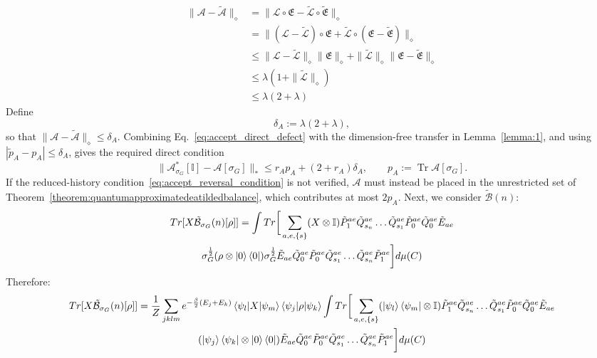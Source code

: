 \documentclass[aps,floatfix,10pt,amssymb,amsfont,amsmath,superscriptaddress,float,nofootinbib,longbibliography,nobalancelastpage,twocolumn]{revtex4-2}
\begin{document}
\begin{widetext}
\begin{align}
    \|\mathcal{A} - \tilde{\mathcal{A}}\|_{\diamond} &= \|\mathcal{L} \circ \mathfrak{E} - \tilde{\mathcal{L}} \circ \tilde{\mathfrak{E}}\|_{\diamond}\\
    &=\|(\mathcal{L}-\tilde{\mathcal{L}}) \circ \mathfrak{E} + \tilde{\mathcal{L}} \circ (\mathfrak{E}-\tilde{\mathfrak{E}})\|_{\diamond}\\
    &\leq\|\mathcal{L}-\tilde{\mathcal{L}}\|_{\diamond} \|\mathfrak{E} \|_{\diamond}+ \|\tilde{\mathcal{L}}\|_{\diamond} \|\mathfrak{E}-\tilde{\mathfrak{E}}\|_{\diamond}\\
    &\leq \lambda(1+\|\tilde{\mathcal{L}}\|_{\diamond})\\
    &\leq \lambda(2+\lambda)
\end{align}
Define
\begin{equation}
    \delta_A:=\lambda(2+\lambda),
\end{equation}
so that $\|\mathcal{A}-\tilde{\mathcal{A}}\|_\diamond\leq\delta_A$. Combining
Eq.~\eqref{eq:accept_direct_defect} with the dimension-free transfer in
Lemma~\ref{lemma:1}, and using
$|\tilde p_A-p_A|\leq\delta_A$, gives the required direct condition
\begin{equation}
    \|\mathcal{A}^*_{\sigma_G}[\mathbb{I}]-\mathcal{A}[\sigma_G]\|_*
    \leq r_Ap_A+(2+r_A)\delta_A,
    \qquad p_A:=\operatorname{Tr}\mathcal A[\sigma_G].
    \label{eq:A_physical_defect}
\end{equation}
If the reduced-history condition~\eqref{eq:accept_reversal_condition} is not
verified, $\mathcal A$ must instead be placed in the unrestricted set of
Theorem~\ref{theorem:quantumapproximatedeatildedbalance}, which contributes
at most $2p_A$.
Next, we consider $\tilde{\mathcal{B}}(n)$:
\begin{multline}
    Tr[X\tilde{\mathcal{B}}_{\sigma_G}(n)[\rho]] = \int Tr\bigg[ \sum_{a,e,\{s\}}(X\otimes \mathbb{I})\tilde P^{ae}_1\tilde Q^{ae}_{s_n}\ldots \tilde Q^{ae}_{s_1}\tilde P^{ae}_0\tilde Q^{ae}_0\tilde E_{ae} \\\sigma_G^{\frac{1}{2}}(\rho\otimes \ket{0}\bra{0})\sigma_G^{\frac{1}{2}}  \tilde E_{ae}\tilde Q^{ae}_0\tilde P^{ae}_0\tilde Q^{ae}_{s_1}\ldots \tilde Q^{ae}_{s_n}\tilde P^{ae}_1\bigg]d\mu(C)
\end{multline}
Therefore:
\begin{multline}
    Tr[X\tilde{\mathcal{B}}_{\sigma_G}(n)[\rho]] = \frac{1}{Z}\sum_{jklm}e^{-\frac{\beta}{2}(E_j+E_k)}\braket{\psi_l|X|\psi_m}\braket{\psi_j|\rho|\psi_k}\int Tr\bigg[ \sum_{a,e,\{s\}}(\ket{\psi_l}\bra{\psi_m}\otimes \mathbb{I})\tilde P^{ae}_1\tilde Q^{ae}_{s_n}\ldots \tilde Q^{ae}_{s_1}\tilde P^{ae}_0\tilde Q^{ae}_0\tilde E_{ae} \\(\ket{\psi_j}\bra{\psi_k}\otimes \ket{0}\bra{0})  \tilde E_{ae}\tilde Q^{ae}_0\tilde P^{ae}_0\tilde Q^{ae}_{s_1}\ldots \tilde Q^{ae}_{s_n}\tilde P^{ae}_1\bigg]d\mu(C)

\end{multline}
\end{widetext}
\end{document}

